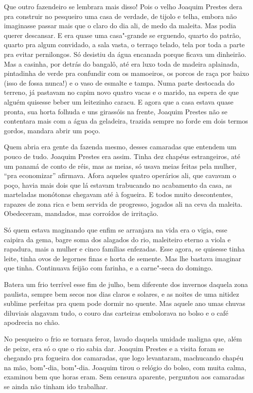 \begin{linenumbers}
Que outro fazendeiro se lembrara mais disso! Pois o velho Joaquim
Prestes dera pra construir no pesqueiro uma casa de verdade, de tijolo e
telha, embora não imaginasse passar mais que o claro do dia ali, de medo
da maleita. Mas podia querer descansar. E era quase uma casa"-grande se
erguendo, quarto do patrão, quarto pra algum convidado, a sala vasta, o
terraço telado, tela por toda a parte pra evitar pernilongos. Só
desistiu da água encanada porque ficava um dinheirão. Mas a casinha, por
detrás do bangalô, até era luxo toda de madeira aplainada, pintadinha de
verde pra confundir com os mamoeiros, os porcos de raça por baixo (isso
de fossa nunca!) e o vaso de esmalte e tampa. Numa parte destocada do
terreno, já pastavam no capim novo quatro vacas e o marido, na espera de
que alguém quisesse beber um leitezinho caracu. E agora que a casa
estava quase pronta, sua horta folhuda e uns girassóis na frente,
Joaquim Prestes não se contentara mais com a água da geladeira, trazida
sempre no forde em dois termos gordos, mandara abrir um poço.

Quem abria era gente da fazenda mesmo, desses camaradas que entendem um
pouco de tudo. Joaquim Prestes era assim. Tinha dez chapéus
estrangeiros, até um panamá de conto de réis, mas as meias, só usava
meias feitas pela mulher, ``pra economizar'' afirmava. Afora aqueles
quatro operários ali, que cavavam o poço, havia mais dois que lá estavam
trabucando no acabamento da casa, as marteladas monótonas chegavam até à
fogueira. E todos muito descontentes, rapazes de zona rica e bem servida
de progresso, jogados ali na ceva da maleita. Obedeceram, mandados, mas
corroídos de irritação.

Só quem estava maginando que enfim se arranjara na vida era o vigia,
esse caipira da gema, bagre soma dos alagados do rio, maleiteiro eterno
a viola e rapadura, mais a mulher e cinco famílias enfezadas. Esse
agora, se quisesse tinha leite, tinha ovos de legornes finas e horta de
semente. Mas lhe bastava imaginar que tinha. Continuava feijão com
farinha, e a carne"-seca do domingo.

Batera um frio terrível esse fim de julho, bem diferente dos invernos
daquela zona paulista, sempre bem secos nos dias claros e solares, e as
noites de uma nitidez sublime perfeitas pra quem pode dormir no quente.
Mas aquele ano umas chuvas diluviais alagavam tudo, o couro das
carteiras embolorava no bolso e o café apodrecia no chão.

No pesqueiro o frio se tornara feroz, lavado daquela umidade maligna
que, além de peixe, era só o que o rio sabia dar. Joaquim Prestes e a
visita foram se chegando pra fogueira dos camaradas, que logo
levantaram, machucando chapéu na mão, bom"-dia, bom"-dia. Joaquim tirou o
relógio do bolso, com muita calma, examinou bem que horas eram. Sem
censura aparente, perguntou aos camaradas se ainda não tinham ido
trabalhar.


\end{linenumbers}
